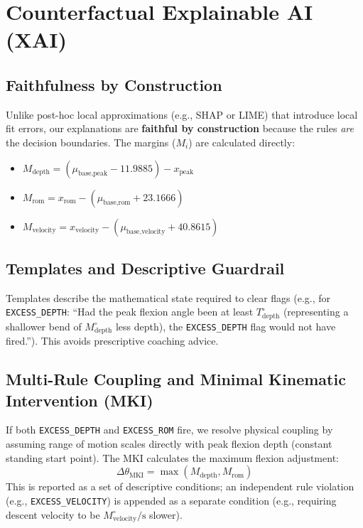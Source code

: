 \section{Counterfactual Explainable AI (XAI)}
\label{sec:xai}

\subsection{Faithfulness by Construction}
\label{sec:faithfulness}

Unlike post-hoc local approximations (e.g., SHAP or LIME) that introduce local fit errors, our explanations are \textbf{faithful by construction} because the rules \textit{are} the decision boundaries. The margins ($M_i$) are calculated directly:
\begin{itemize}
  \item $M_{\text{depth}} = (\mu_{\text{base}, \text{peak}} - 11.9885) - x_{\text{peak}}$
  \item $M_{\text{rom}} = x_{\text{rom}} - (\mu_{\text{base}, \text{rom}} + 23.1666)$
  \item $M_{\text{velocity}} = x_{\text{velocity}} - (\mu_{\text{base}, \text{velocity}} + 40.8615)$
\end{itemize}

\subsection{Templates and Descriptive Guardrail}
\label{sec:templates}

Templates describe the mathematical state required to clear flags (e.g., for \texttt{EXCESS\_DEPTH}: ``Had the peak flexion angle been at least $T_{\text{depth}}^\circ$ (representing a shallower bend of $M_{\text{depth}}^\circ$ less depth), the \texttt{EXCESS\_DEPTH} flag would not have fired.''). This avoids prescriptive coaching advice.

\subsection{Multi-Rule Coupling and Minimal Kinematic Intervention (MKI)}
\label{sec:mki}

If both \texttt{EXCESS\_DEPTH} and \texttt{EXCESS\_ROM} fire, we resolve physical coupling by assuming range of motion scales directly with peak flexion depth (constant standing start point). The MKI calculates the maximum flexion adjustment:
\begin{equation}
\Delta \theta_{\text{MKI}} = \max(M_{\text{depth}}, M_{\text{rom}})
\label{eq:mki}
\end{equation}
This is reported as a set of descriptive conditions; an independent rule violation (e.g., \texttt{EXCESS\_VELOCITY}) is appended as a separate condition (e.g., requiring descent velocity to be $M_{\text{velocity}}^\circ/\text{s}$ slower).


